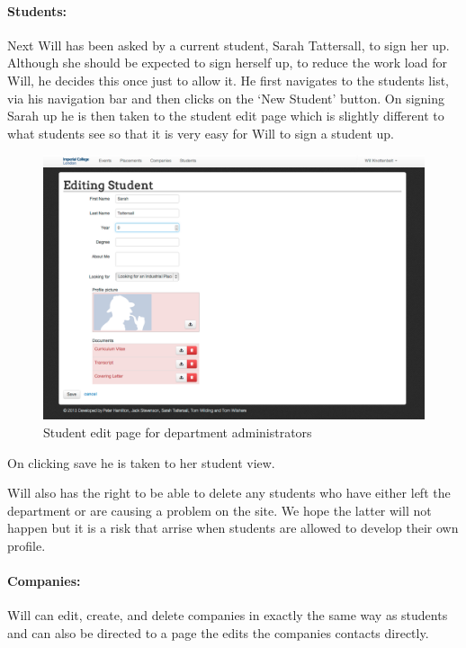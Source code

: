   \paragraph{Students:}
    Next Will has been asked by a current student, Sarah Tattersall, to sign her up. Although she should be expected to sign herself up, to reduce the work load for Will, he decides this once just to allow it.
    He first navigates to the students list, via his navigation bar and then clicks on the `New Student' button.
    On signing Sarah up he is then taken to the student edit page which is slightly different to what students see so that it is very easy for Will to sign a student up.

    \begin{figure}[H]\centering
    \includegraphics[scale=0.3]{images/user_experiences/admin/admin_student_edit}
    \caption{Student edit page for department administrators}
    \end{figure}

    On clicking save he is taken to her student view. 

    Will also has the right to be able to delete any students who have either left the department or are causing a problem on the site. We hope the latter will not happen but it is a risk that arrise when students are allowed to develop their own profile.

  \paragraph{Companies:}
    Will can edit, create, and delete companies in exactly the same way as students and can also be directed to a page the edits the companies contacts directly. 

